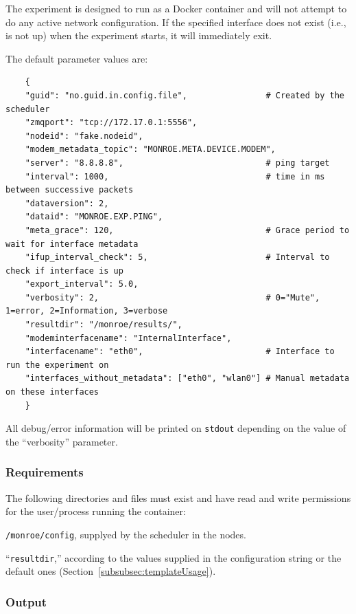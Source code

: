 \documentclass[a4paper,10pt]{article}
\newcommand{\VerbatimFont}{\footnotesize}
\newcommand{\identifier}[1]{{\texttt{\small{#1}}}}
\begin{document}
The experiment is designed to run as a Docker container and will not attempt to do any active network configuration.
If the specified interface does not exist (i.e., is not up) when the experiment starts, it will immediately exit.

The default parameter values are:

{\VerbatimFont
	\begin{verbatim}
	{
	"guid": "no.guid.in.config.file",                # Created by the scheduler
	"zmqport": "tcp://172.17.0.1:5556",
	"nodeid": "fake.nodeid",
	"modem_metadata_topic": "MONROE.META.DEVICE.MODEM",
	"server": "8.8.8.8",                             # ping target
	"interval": 1000,                                # time in ms between successive packets
	"dataversion": 2,
	"dataid": "MONROE.EXP.PING",
	"meta_grace": 120,                               # Grace period to wait for interface metadata
	"ifup_interval_check": 5,                        # Interval to check if interface is up
	"export_interval": 5.0,
	"verbosity": 2,                                  # 0="Mute", 1=error, 2=Information, 3=verbose
	"resultdir": "/monroe/results/",
	"modeminterfacename": "InternalInterface",
	"interfacename": "eth0",                         # Interface to run the experiment on
	"interfaces_without_metadata": ["eth0", "wlan0"] # Manual metadata on these interfaces
	}
	\end{verbatim}}

All debug/error information will be printed on \identifier{stdout} depending on the value of the ``verbosity'' parameter.

\subsubsection{Requirements}

The following directories and files must exist and have read and write permissions for the user/process running the container:

\begin{itemize*}
	\item \identifier{/monroe/config}, supplyed by the scheduler in the nodes.
	\item ``\identifier{resultdir},'' according to the values supplied in the configuration string or the default ones (Section~\ref{subsubsec:templateUsage}).
\end{itemize*}

\subsubsection{Output}
\end{document}
